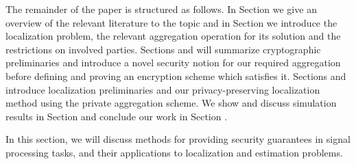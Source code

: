 \documentclass[10pt,letterpaper,oneside,twocolumn,journal]{IEEEtran}
\theoremstyle{definition}
\theoremstyle{definition}
\theoremstyle{remark}
\begin{document}
The remainder of the paper is structured as follows. In Section  we give an overview of the relevant literature to the topic and in Section  we introduce the localization problem, the relevant aggregation operation for its solution and the restrictions on involved parties. Sections  and  will summarize cryptographic preliminaries and introduce a novel security notion for our required aggregation before defining and proving an encryption scheme which satisfies it. Sections  and  introduce localization preliminaries and our privacy-preserving localization method using the private aggregation scheme. We show and discuss simulation results in Section  and conclude our work in Section .


\label{sec:lit_overview}
In this section, we will discuss methods for providing security guarantees in signal processing tasks, and their applications to localization and estimation problems.

\end{document}
